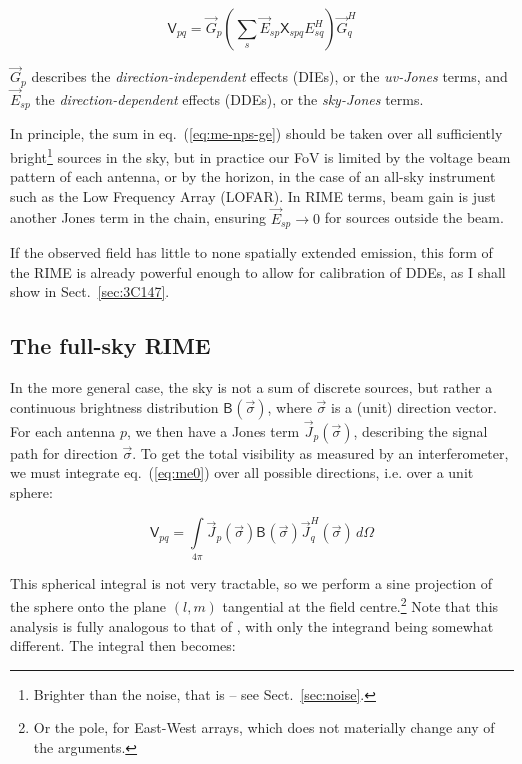 \documentclass[]{aa}
\newcommand{\herm}{H}
\newcommand{\jones}[2]{\vec {#1}_{#2}}
\newcommand{\jonesT}[2]{\vec {#1}^{\herm}_{#2}}
\newcommand{\coh}[2]{\mathsf{{#1}}_{{#2}}}
\begin{document}
  \begin{equation}\label{eq:me-nps-ge}
  \coh{V}{pq} = \jones{G}{p} \left ( \sum_{s}{\jones{E}{sp} \coh{X}{spq} E^\herm_{sq}} \right ) \jonesT{G}{q}
  \end{equation}

$\jones{G}{p}$ describes the {\em direction-independent} effects (DIEs), or the \emph{uv-Jones} terms, and $\jones{E}{sp}$ the {\em  direction-dependent} effects (DDEs), or the \emph{sky-Jones} terms. 

In principle, the sum in eq.~(\ref{eq:me-nps-ge}) should be taken over all sufficiently bright\footnote{Brighter than the noise, that is -- see Sect.~\ref{sec:noise}.} sources in the sky, but in practice our FoV is limited by the voltage beam pattern of each antenna, or by the horizon, in the case of an all-sky instrument such as the Low Frequency Array (LOFAR). In RIME terms, beam gain is just another Jones term in the chain, ensuring $\jones{E}{sp}\to 0$ for sources outside the beam.

If the observed field has little to none spatially extended emission, this form of the RIME is already powerful enough to allow for calibration of DDEs, as I shall show in Sect.~\ref{sec:3C147}.

\subsection{The full-sky RIME\label{sec:full-sky-rime}}

In the more general case, the sky is not a sum of discrete sources, but rather a continuous brightness distribution $\coh{B}{}(\vec\sigma)$, where $\vec\sigma$ is a (unit) direction vector. For each antenna $p$, we then have a Jones term $\jones{J}{p}(\vec\sigma)$, describing the signal path for direction $\vec\sigma$. To get the total visibility as measured by an interferometer, we must integrate eq.~(\ref{eq:me0}) over all possible directions, i.e. over a unit sphere:

\[
\coh{V}{pq} = \int\limits_{4\pi} \jones{J}{p}(\vec\sigma) \coh{B}{}(\vec\sigma) \jonesT{J}{q}(\vec\sigma) \, d\Omega
\]

This spherical integral is not very tractable, so we perform a sine projection of the sphere onto the plane $(l,m)$ 
tangential at the field centre.\footnote{Or the pole, for East-West arrays, which does not materially change any of the arguments.} Note that this analysis is fully analogous to that of \citet[Sect.~3.1]{tms}, with only the integrand being somewhat different.  The integral then becomes:
\end{document}
